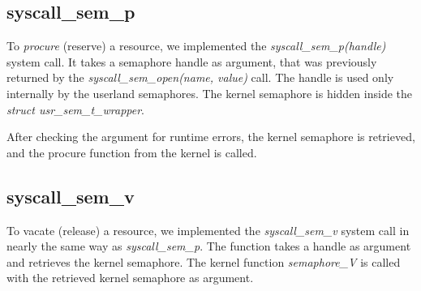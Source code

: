 \documentclass[11pt]{article}
\begin{document}
\subsection{syscall_sem_p}
To \emph{procure} (reserve) a resource, we implemented the \emph{syscall_sem_p(handle)} system call. It takes a semaphore handle as argument, that was previously returned by the \emph{syscall_sem_open(name, value)} call. The handle is used only internally by the userland semaphores. The kernel semaphore is hidden inside the \emph{struct usr_sem_t_wrapper}.

After checking the argument for runtime errors, the kernel semaphore is retrieved, and the procure function from the kernel is called.








\subsection{syscall_sem_v}
To vacate (release) a resource, we implemented the \emph{syscall_sem_v} system call in nearly the same way as \emph{syscall_sem_p}. The function takes a handle as argument and retrieves the kernel semaphore. The kernel function \emph{semaphore_V} is called with the retrieved kernel semaphore as argument.




\end{document}
